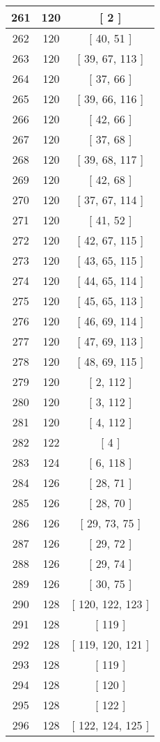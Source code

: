 \begin{center}
\begin{longtable}[H]{|| c c c ||}
261 & 120 & [ 2 ]
\\\hline
262 & 120 & [ 40, 51 ]
\\\hline
263 & 120 & [ 39, 67, 113 ]
\\\hline
264 & 120 & [ 37, 66 ]
\\\hline
265 & 120 & [ 39, 66, 116 ]
\\\hline
266 & 120 & [ 42, 66 ]
\\\hline
267 & 120 & [ 37, 68 ]
\\\hline
268 & 120 & [ 39, 68, 117 ]
\\\hline
269 & 120 & [ 42, 68 ]
\\\hline
270 & 120 & [ 37, 67, 114 ]
\\\hline
271 & 120 & [ 41, 52 ]
\\\hline
272 & 120 & [ 42, 67, 115 ]
\\\hline
273 & 120 & [ 43, 65, 115 ]
\\\hline
274 & 120 & [ 44, 65, 114 ]
\\\hline
275 & 120 & [ 45, 65, 113 ]
\\\hline
276 & 120 & [ 46, 69, 114 ]
\\\hline
277 & 120 & [ 47, 69, 113 ]
\\\hline
278 & 120 & [ 48, 69, 115 ]
\\\hline
279 & 120 & [ 2, 112 ]
\\\hline
280 & 120 & [ 3, 112 ]
\\\hline
281 & 120 & [ 4, 112 ]
\\\hline
282 & 122 & [ 4 ]
\\\hline
283 & 124 & [ 6, 118 ]
\\\hline
284 & 126 & [ 28, 71 ]
\\\hline
285 & 126 & [ 28, 70 ]
\\\hline
286 & 126 & [ 29, 73, 75 ]
\\\hline
287 & 126 & [ 29, 72 ]
\\\hline
288 & 126 & [ 29, 74 ]
\\\hline
289 & 126 & [ 30, 75 ]
\\\hline
290 & 128 & [ 120, 122, 123 ]
\\\hline
291 & 128 & [ 119 ]
\\\hline
292 & 128 & [ 119, 120, 121 ]
\\\hline
293 & 128 & [ 119 ]
\\\hline
294 & 128 & [ 120 ]
\\\hline
295 & 128 & [ 122 ]
\\\hline
296 & 128 & [ 122, 124, 125 ]

\end{longtable}
\end{center}
